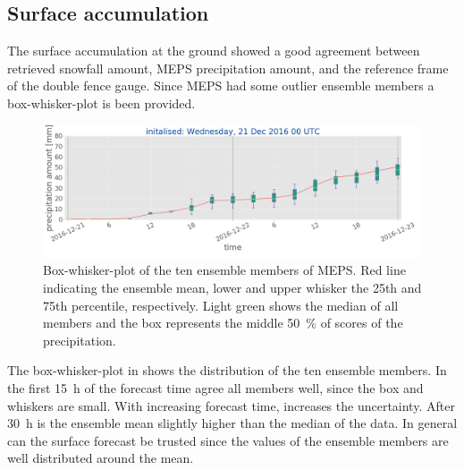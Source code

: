 \subsection{Surface accumulation}
The surface accumulation at the ground showed a good agreement between retrieved snowfall amount, MEPS precipitation amount, and the reference frame of the double fence gauge. Since MEPS had some outlier ensemble members a box-whisker-plot is been provided.
\begin{figure}[h]
	\includegraphics[width=\textwidth]{./fig_boxplot_sfc/20161221_0}
	\caption{Box-whisker-plot of the ten ensemble members of MEPS. Red line indicating the ensemble mean, lower and upper whisker the 25th and 75th percentile, respectively. Light green shows the median of all members and the box represents the middle \SI{50}{\percent} of scores of the precipitation.}\label{fig:boxplt21}
\end{figure}
The box-whisker-plot in  shows the distribution of the ten ensemble members. In the first \SI{15}{\hour} of the forecast time agree all members well, since the box and whiskers are small. With increasing forecast time, increases the uncertainty. After \SI{30}{\hour} is the ensemble mean slightly higher than the median of the data. In general can the surface forecast be trusted since the values of the ensemble members are well distributed around the mean.
